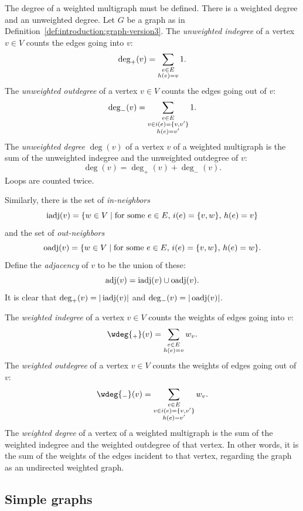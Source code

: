 The degree of a weighted multigraph must be defined. There is a
weighted degree and an unweighted degree. Let $G$ be a graph as in
Definition~\ref{def:introduction:graph-version3}. The
\emph{unweighted indegree} of a vertex
$v \in V$ counts the edges going into $v$:
\[
\deg_+(v)\index{$\deg_+$}
=
\sum_{\substack{e \in E \\ h(e)=v}} 1.
\]
The \emph{unweighted outdegree} of a
vertex $v \in V$ counts the edges going out of $v$:
\[
\deg_-(v)\index{$\deg_-$}
=
\sum_{\substack{e \in E \\ v \in i(e)=\{v,v'\} \\ h(e)= v'}} 1.
\]
The \emph{unweighted degree} $\deg(v)$ of a
vertex $v$ of a weighted multigraph is the sum of the unweighted
indegree and the unweighted outdegree of $v$:
\[
\deg(v)
=
\deg_+(v) + \deg_-(v).
\]
Loops are counted twice.

Similarly, there is the set of
\emph{in-neighbors}
\[
\operatorname*{iadj}(v)
=
\{w \in V \mid \text{for some } e \in E,\, i(e)=\{v,w\},\, h(e)=v\}
\]
and the set of \emph{out-neighbors}
\[
\operatorname*{oadj}(v)
=
\{w \in V \mid \text{for some } e \in E,\, i(e)=\{v,w\},\, h(e)=w\}.
\]
Define the \emph{adjacency} of $v$ to be
the union of these:
\[
\operatorname*{adj}(v)
=
\operatorname*{iadj}(v) \cup \operatorname*{oadj}(v).
\]
It is clear that $\deg_+(v) = |\operatorname*{iadj}(v)|$ and $\deg_-(v) = |\operatorname*{oadj}(v)|$.

The \emph{weighted indegree} of a vertex
$v \in V$ counts the weights of edges going into $v$:
\[
\wdeg{_+}(v)
=
\sum_{\substack{e \in E \\ h(e)=v}} w_v.
\]
The \emph{weighted outdegree} of a vertex
$v \in V$ counts the weights of edges going out of $v$:
\[
\wdeg{_-}(v)
=
\sum_{\substack{e \in E \\ v \in i(e)=\{v,v'\} \\ h(e)= v'}} w_v.
\]
The \emph{weighted degree} of a vertex of a
weighted multigraph is the sum of the weighted indegree and the
weighted outdegree of that vertex. In other words, it is the sum of
the weights of the edges incident to that vertex, regarding the graph
as an undirected weighted graph.

\subsection{Simple graphs}

